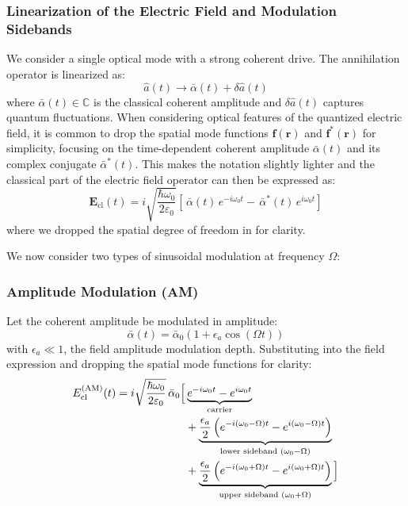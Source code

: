 \subsubsection*{Linearization of the Electric Field and Modulation Sidebands}

We consider a single optical mode with a strong coherent drive. The annihilation operator is linearized as:
\begin{equation}
    \hat{a}(t) \to \bar{\alpha}(t) + \delta \hat{a}(t)
\end{equation}
where $\bar{\alpha}(t) \in \mathbb{C}$ is the classical coherent amplitude and $\delta \hat{a}(t)$ captures quantum fluctuations.
When considering optical features of the quantized electric field, it is common to drop the spatial mode functions $\mathbf{f}(\mathbf{r})$ and $\mathbf{f}^*(\mathbf{r})$ for simplicity, focusing on the time-dependent coherent amplitude $\bar{\alpha}(t)$ and its complex conjugate $\bar{\alpha}^*(t)$. This makes the notation slightly lighter and the classical part of the electric field operator can then be expressed as:
\begin{equation}
    \mathbf{E}_{\text{cl}}( t) = i \sqrt{\frac{\hbar \omega_0}{2 \varepsilon_0}} \left[
    \, \bar{\alpha}(t)\, e^{-i \omega_0 t}
    - \, \bar{\alpha}^*(t)\, e^{i \omega_0 t}
    \right]
\end{equation}
where we dropped the spatial degree of freedom in for clarity.

We now consider two types of sinusoidal modulation at frequency $\Omega$:

\subsubsection*{Amplitude Modulation (AM)}

Let the coherent amplitude be modulated in amplitude:
\begin{equation}
  \bar{\alpha}(t) = \bar{\alpha}_0 \left(1 + \epsilon_a \cos(\Omega t)\right)
\end{equation}
with $\epsilon_a \ll 1$, the field amplitude modulation depth. Substituting into the field expression and dropping the spatial mode functions for clarity:
\begin{align}
  E_{\text{cl}}^{\text{(AM)}}(t) =
  i \sqrt{\frac{\hbar \omega_0}{2 \varepsilon_0}}\, \bar{\alpha}_0 \Big[
  &\underbrace{e^{-i\omega_0 t} - e^{i\omega_0 t}}_{\text{carrier}} \notag \\
  &+ \underbrace{\frac{\epsilon_a}{2} \left( e^{-i(\omega_0 - \Omega)t} - e^{i(\omega_0 - \Omega)t} \right)}_{\text{lower sideband } (\omega_0 - \Omega)} \notag \\
  &+ \underbrace{\frac{\epsilon_a}{2} \left( e^{-i(\omega_0 + \Omega)t} - e^{i(\omega_0 + \Omega)t} \right)}_{\text{upper sideband } (\omega_0 + \Omega)}
  \Big]
\end{align}

